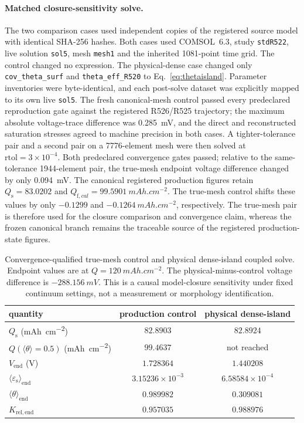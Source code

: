 \documentclass[11pt]{article}
\newcommand{\epss}{\varepsilon_{\mathrm{s}}}
\begin{document}
\paragraph{Matched closure-sensitivity solve.}
The two comparison cases used independent copies of the registered source model with identical SHA-256
hashes. Both cases
used COMSOL~6.3, study \texttt{stdR522}, live solution \texttt{sol5}, mesh \texttt{mesh1} and the inherited
1081-point time grid. The control changed no expression. The physical-dense case changed only
\texttt{cov\_theta\_surf} and \texttt{theta\_eff\_R520} to Eq.~\eqref{eq:thetaisland}. Parameter inventories
were byte-identical, and each post-solve dataset was explicitly mapped to its own live \texttt{sol5}. The
fresh canonical-mesh control passed every predeclared reproduction gate against the registered R526/R525
trajectory; the
maximum absolute voltage-trace difference was \SI{0.285}{mV}, and the direct and reconstructed saturation
stresses agreed to machine precision in both cases. A tighter-tolerance pair and a second pair on a
7776-element mesh were then solved at $\mathrm{rtol}=3\times10^{-4}$. Both predeclared convergence gates
passed; relative to the same-tolerance 1944-element pair, the true-mesh endpoint voltage difference changed
by only \SI{0.094}{mV}.
The canonical registered production figures retain $Q_{\mathrm s}=83.0202$ and
$Q_{\mathrm f,cal}=99.5901~\si{mAh.cm^{-2}}$. The true-mesh control shifts these values by only
$-0.1299$ and $-0.1264~\si{mAh.cm^{-2}}$, respectively. The true-mesh pair is therefore used for the
closure comparison and convergence claim, whereas the frozen canonical branch remains the traceable source
of the registered production-state figures.

\begin{table}[h]\centering\small
\caption{Convergence-qualified true-mesh control and physical dense-island coupled solve. Endpoint values are at
$Q=\SI{120}{mAh.cm^{-2}}$. The physical-minus-control voltage difference is
$-\SI{288.156}{mV}$. This is a causal model-closure sensitivity under fixed continuum settings, not a
measurement or morphology identification.}
\label{tab:matchedclosures}
\begin{tabular}{lcc}
\toprule
quantity & production control & physical dense-island \\
\midrule
$Q_{\mathrm s}$ (\si{mAh.cm^{-2}}) & $82.8903$ & $82.8924$ \\
$Q(\langle\theta\rangle=0.5)$ (\si{mAh.cm^{-2}}) & $99.4637$ & not reached \\
$V_{\mathrm{end}}$ (V) & $1.728364$ & $1.440208$ \\
$\langle\epss\rangle_{\mathrm{end}}$ & $3.15236\times10^{-3}$ & $6.58584\times10^{-4}$ \\
$\langle\theta\rangle_{\mathrm{end}}$ & $0.989982$ & $0.309081$ \\
$K_{\mathrm{rel,end}}$ & $0.957035$ & $0.988976$ \\
\bottomrule
\end{tabular}
\end{table}
\end{document}
